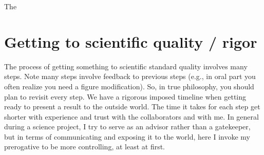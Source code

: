 \documentclass[letterpaper,10pt,english]{sphinxmanual}
\begin{document}
\sphinxAtStartPar
The {\hyperref[\detokenize{PaperWritingTips:paperwritingtips}]{}}


\section{Getting to scientific quality / rigor}
\label{\detokenize{02Elements:getting-to-scientific-quality-rigor}}
\sphinxAtStartPar
The process of getting something to scientific standard quality involves many steps.
Note many steps involve feedback to previous steps (e.g., in oral part you often realize you need a figure modification).
So, in true {\hyperref[\detokenize{03DevOps:devops}]{}} philosophy, you should plan to revisit every step.
We have a rigorous imposed timeline when getting ready to present a result to the outside world.
The time it takes for each step get shorter with experience and trust with the collaborators and with me.
In general during a science project, I try to serve as an advisor rather than a gatekeeper, but in terms of communicating and exposing it to the world, here I invoke my prerogative to be more controlling, at least at first.
\end{document}
